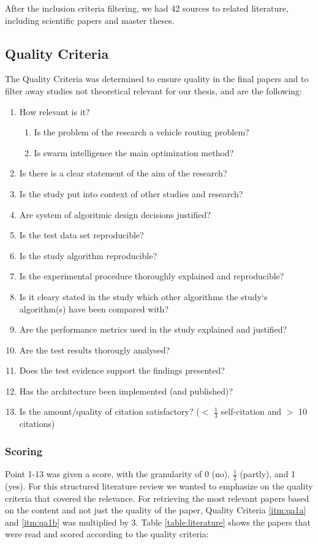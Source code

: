 After the inclusion criteria filtering, we had 42 sources to related literature, including scientific papers and master theses. 

\subsection{Quality Criteria} 
The Quality Criteria was determined to ensure quality in the final papers and to filter away studies not theoretical relevant for our thesis, and are the following:
\begin{enumerate}
\item \label{itm:qa1}How relevant is it?
\begin{enumerate}
\item \label{itm:qa1a}Is the problem of the research a vehicle routing problem?
\item \label{itm:qa1b}Is swarm intelligence the main optimization method? 
\end{enumerate}
\item Is there is a clear statement of the aim of the research?
\item Is the study put into context of other studies and research?
\item Are system of algoritmic design decisions justified?
\item Is the test data set reproducible?
\item Is the study algorithm reproducible?
\item Is the experimental procedure thoroughly explained and reproducible?
\item Is it cleary stated in the study which other algorithms the study`s algorithm(s) have been compared with?
\item Are the performance metrics used in the study explained and justified?
\item Are the test results thorougly analysed?
\item Does the test evidence support the findings presented?
\item Has the architecture been implemented (and published)?
\item Is the amount/quality of citation satisfactory? ($<$ $\frac{1}{3}$  self-citation and $>$ 10 citations)
\end{enumerate}

\subsubsection{Scoring}
Point 1-13 was given a score, with the granularity of 0 (no), $\frac{1}{2}$ (partly), and 1 (yes). For this structured literature review we wanted to emphasize on the quality criteria that covered the relevance. For retrieving the most relevant papers based on the content and not just the quality of the paper, Quality Criteria \vref{itm:qa1a} and \vref{itm:qa1b} was multiplied by 3. Table \vref{table:literature} shows the papers that were read and scored according to the quality criteria: 

